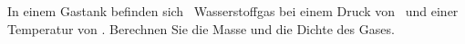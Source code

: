 In einem Gastank befinden sich \VHO\ Wasserstoffgas bei einem Druck von \pHO\ und einer Temperatur von \thHO. Berechnen Sie die Masse und die Dichte des Gases.
